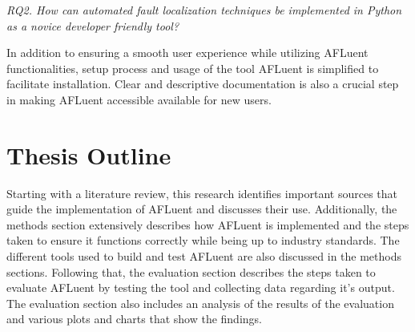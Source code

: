 \begin{center}
	\emph{RQ2. How can automated fault localization techniques be implemented in
	Python as a novice developer friendly tool?
	}
\end{center}

In addition to ensuring a smooth user experience while utilizing AFLuent
functionalities, setup process and usage of the tool AFLuent is simplified to
facilitate installation. Clear and descriptive documentation is also a crucial
step in making AFLuent accessible available for new users.

\section{Thesis Outline}
\label{sec:outline}

Starting with a literature review, this research identifies important sources
that guide the implementation of AFLuent and discusses their use. Additionally,
the methods section extensively describes how AFLuent is implemented and the
steps taken to ensure it functions correctly while being up to industry
standards. The different tools used to build and test AFLuent are also
discussed in the methods sections. Following that, the evaluation section
describes the steps taken to evaluate AFLuent by testing the tool and
collecting data regarding it's output. The evaluation section also includes an
analysis of the results of the evaluation and various plots and charts that
show the findings.
